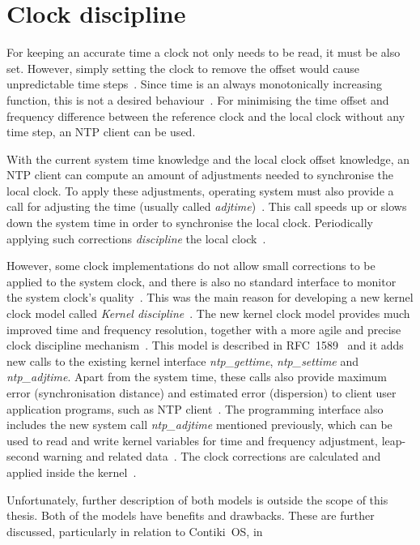\section{Clock discipline}
For keeping an accurate time a clock not only needs to be read, it must be also set.
However, simply setting the clock to remove the offset would cause unpredictable time steps~\cite{ntp-faq}.
Since time is an always monotonically increasing function, this is not a desired behaviour~\cite{ntp-daq}.
For minimising the time offset and frequency difference between
the reference clock and the local clock without any time step,
an NTP client can be used.

With the current system time knowledge and the local clock offset knowledge,
an NTP client can compute an amount of adjustments needed to synchronise the local clock.
To apply these adjustments, operating system must also provide a call
for adjusting the time (usually called {\it{adjtime}})~\cite{nanokernel}.
This call speeds up or slows down the system time in order to synchronise the local clock.
Periodically applying such corrections {\it{discipline}} the local clock~\cite{ntp-faq}.

However, some clock implementations do not allow small corrections to be applied
to the system clock, and there is also no standard interface to monitor the system clock's quality~\cite{ntp-faq}.
This was the main reason for developing a new kernel clock model called {\it{Kernel discipline}}~\cite{nanokernel}.
The new kernel clock model provides much improved time and frequency
resolution, together with a more agile and precise clock discipline mechanism~\cite{nanokernel}.
This model is described in RFC~1589~\cite{rfc1589} and it adds new calls to the existing kernel interface
{\it{ntp\_gettime}}, {\it{ntp\_settime}} and {\it{ntp\_adjtime}}.
Apart from the system time, these calls also provide maximum error (synchronisation distance)
and estimated error (dispersion) to client user application programs, such as NTP client~\cite{rfc1589}.
The programming interface also includes the new
system call {\it{ntp\_adjtime}} mentioned previously, which can be used
to read and write kernel variables for time and frequency
adjustment, leap-second warning and related data~\cite{rfc1589}.
The clock corrections are calculated and applied inside the kernel~\cite{ntp-faq}.

Unfortunately, further description of both models is outside the scope of this thesis.
Both of the models have benefits and drawbacks.
These are further discussed, particularly in relation to Contiki~OS, in %
